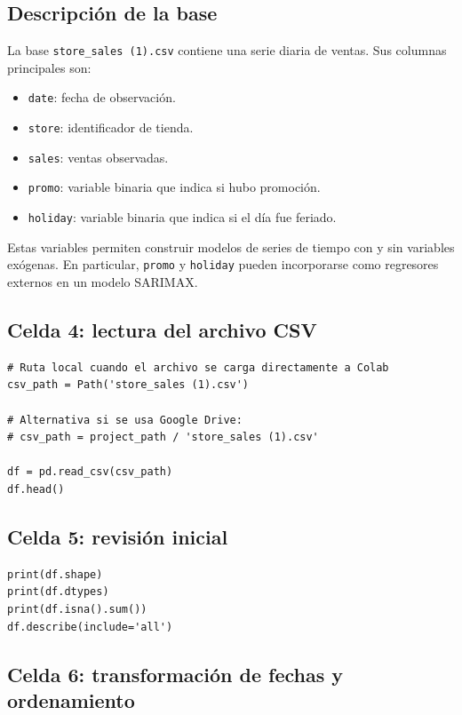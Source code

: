 \documentclass[11pt,letterpaper]{article}
\newcommand{\code}[1]{\texttt{#1}}
\begin{document}
\subsection{Descripción de la base}

\begin{markdowncell}
La base \code{store\_sales (1).csv} contiene una serie diaria de ventas. Sus columnas principales son:
\begin{itemize}
    \item \code{date}: fecha de observación.
    \item \code{store}: identificador de tienda.
    \item \code{sales}: ventas observadas.
    \item \code{promo}: variable binaria que indica si hubo promoción.
    \item \code{holiday}: variable binaria que indica si el día fue feriado.
\end{itemize}
Estas variables permiten construir modelos de series de tiempo con y sin variables exógenas. En particular, \code{promo} y \code{holiday} pueden incorporarse como regresores externos en un modelo SARIMAX.
\end{markdowncell}

\subsection{Celda 4: lectura del archivo CSV}

\begin{lstlisting}[style=pythoncolab]
# Ruta local cuando el archivo se carga directamente a Colab
csv_path = Path('store_sales (1).csv')

# Alternativa si se usa Google Drive:
# csv_path = project_path / 'store_sales (1).csv'

df = pd.read_csv(csv_path)
df.head()
\end{lstlisting}

\subsection{Celda 5: revisión inicial}

\begin{lstlisting}[style=pythoncolab]
print(df.shape)
print(df.dtypes)
print(df.isna().sum())
df.describe(include='all')
\end{lstlisting}

\subsection{Celda 6: transformación de fechas y ordenamiento}
\end{document}
